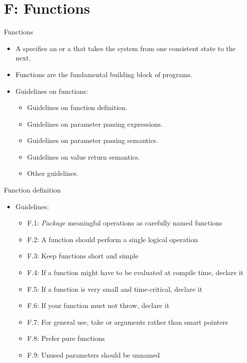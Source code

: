 \section{F: Functions}

\begin{frame}[t]{Functions}
\begin{itemize}
  \item A  specifies an  or a  
        that takes the system from one consistent state to the next.

  \item Functions are the fundamental building block of programs.

  \item Guidelines on functions:
    \begin{itemize}
      \item Guidelines on function definition.
      \item Guidelines on parameter passing expressions.
      \item Guidelines on parameter passing semantics.
      \item Guidelines on value return semantics.
      \item Other guidelines.
    \end{itemize}
\end{itemize}
\end{frame}

\begin{frame}[t]{Function definition}
\begin{itemize}
  \item Guidelines:
    \begin{itemize}
      \item F.1: \emph{Package} meaningful operations as carefully named functions
      \item F.2: A function should perform a single logical operation
      \item F.3: Keep functions short and simple
      \item F.4: If a function might have to be evaluated at compile time, declare it 
      \item F.5: If a function is very small and time-critical, declare it 
      \item F.6: If your function must not throw, declare it 
      \item F.7: For general use, take  or  arguments rather than smart pointers
      \item F.8: Prefer pure functions
      \item F.9: Unused parameters should be unnamed
    \end{itemize}
\end{itemize}
\end{frame}

